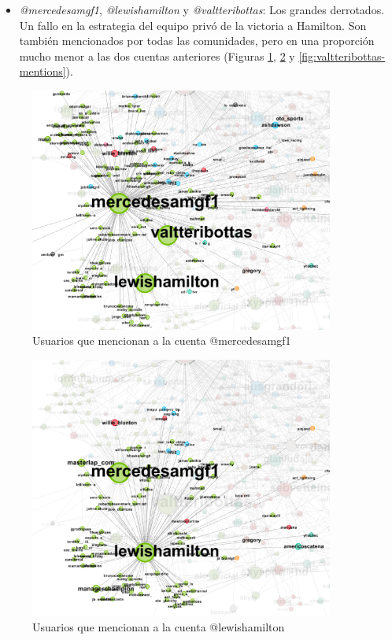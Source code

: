 \begin{itemize}	
	\item \textit{@mercedesamgf1}, \textit{@lewishamilton} y \textit{@valtteribottas}: Los grandes derrotados. Un fallo en la estrategia del equipo privó de la victoria a Hamilton. Son también mencionados por todas las comunidades, pero en una proporción mucho menor a las dos cuentas anteriores (Figuras \ref{fig:mercedesamgf1-mentions}, \ref{fig:lewishamilton-mentions} y \ref{fig:valtteribottas-mentions}).
\end{itemize}

\begin{figure}[H]
	\centering
	\includegraphics[width=10cm]{img/mercedesamgf1-mentions}
	\caption{Usuarios que mencionan a la cuenta @mercedesamgf1}
	\label{fig:mercedesamgf1-mentions}
\end{figure}

\begin{figure}[H]
	\centering
	\includegraphics[width=10cm]{img/lewishamilton-mentions}
	\caption{Usuarios que mencionan a la cuenta @lewishamilton}
	\label{fig:lewishamilton-mentions}
\end{figure}

